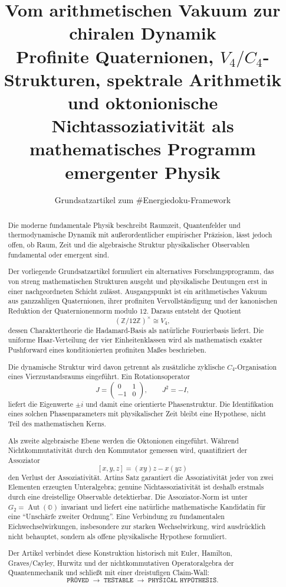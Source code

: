 \documentclass[11pt,a4paper]{article}
\title{\textbf{Vom arithmetischen Vakuum zur chiralen Dynamik}\\[0.5em]
\large Profinite Quaternionen, $V_4/C_4$-Strukturen, spektrale Arithmetik und oktonionische Nichtassoziativität als mathematisches Programm emergenter Physik}
\author{Grundsatzartikel zum \#Energiedoku-Framework}
\date{}
\newcommand{\OO}{\mathbb O}
\newcommand{\ZZ}{\mathbb Z}
\newcommand{\Aut}{\operatorname{Aut}}
\begin{document}
\maketitle

\begin{abstract}
Die moderne fundamentale Physik beschreibt Raumzeit, Quantenfelder und thermodynamische Dynamik mit außerordentlicher empirischer Präzision, lässt jedoch offen, ob Raum, Zeit und die algebraische Struktur physikalischer Observablen fundamental oder emergent sind.

Der vorliegende Grundsatzartikel formuliert ein alternatives Forschungsprogramm, das von streng mathematischen Strukturen ausgeht und physikalische Deutungen erst in einer nachgeordneten Schicht zulässt. Ausgangspunkt ist ein arithmetisches Vakuum aus ganzzahligen Quaternionen, ihrer profiniten Vervollständigung und der kanonischen Reduktion der Quaternionennorm modulo $12$. Daraus entsteht der Quotient
\[
(\ZZ/12\ZZ)^\times \cong V_4,
\]
dessen Charaktertheorie die Hadamard-Basis als natürliche Fourierbasis liefert. Die uniforme Haar-Verteilung der vier Einheitenklassen wird als mathematisch exakter Pushforward eines konditionierten profiniten Maßes beschrieben.

Die dynamische Struktur wird davon getrennt als zusätzliche zyklische $C_4$-Organisation eines Vierzustandsraums eingeführt. Ein Rotationsoperator
\[
J=\begin{pmatrix}0&1\\-1&0\end{pmatrix},\qquad J^2=-I,
\]
liefert die Eigenwerte $\pm i$ und damit eine orientierte Phasenstruktur. Die Identifikation eines solchen Phasenparameters mit physikalischer Zeit bleibt eine Hypothese, nicht Teil des mathematischen Kerns.

Als zweite algebraische Ebene werden die Oktonionen eingeführt. Während Nichtkommutativität durch den Kommutator gemessen wird, quantifiziert der Assoziator
\[
[x,y,z]=(xy)z-x(yz)
\]
den Verlust der Assoziativität. Artins Satz garantiert die Assoziativität jeder von zwei Elementen erzeugten Unteralgebra; genuine Nichtassoziativität ist deshalb erstmals durch eine dreistellige Observable detektierbar. Die Assoziator-Norm ist unter $G_2=\Aut(\OO)$ invariant und liefert eine natürliche mathematische Kandidatin für eine ``Unschärfe zweiter Ordnung''. Eine Verbindung zu fundamentalen Eichwechselwirkungen, insbesondere zur starken Wechselwirkung, wird ausdrücklich nicht behauptet, sondern als offene physikalische Hypothese formuliert.

Der Artikel verbindet diese Konstruktion historisch mit Euler, Hamilton, Graves/Cayley, Hurwitz und der nichtkommutativen Operatoralgebra der Quantenmechanik und schließt mit einer dreistufigen Claim-Wall:
\[
\texttt{PROVED}\;\longrightarrow\;\texttt{TESTABLE}\;\longrightarrow\;\texttt{PHYSICAL HYPOTHESIS}.
\]
\end{abstract}
\end{document}
